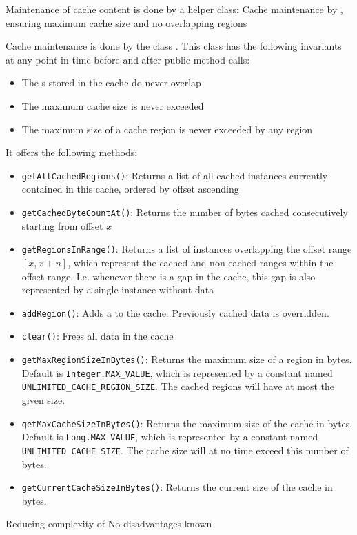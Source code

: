 Maintenance of cache content is done by a helper class:
{%
Cache maintenance by \MediumCache{}, ensuring maximum cache size and no overlapping regions
}
{%
Cache maintenance is done by the class \MediumCache{}. This class has the following invariants at any point in time before and after public method calls:
\begin{itemize}
\item The \MediumRegion{}s stored in the cache do never overlap
\item The maximum cache size is never exceeded
\item The maximum size of a cache region is never exceeded by any region
\end{itemize}

It offers the following methods:
\begin{itemize}
\item \texttt{getAllCachedRegions()}: Returns a list of all cached \MediumRegion{} instances currently contained in this cache, ordered by offset ascending
\item \texttt{getCachedByteCountAt()}: Returns the number of bytes cached consecutively starting from offset $x$
\item \texttt{getRegionsInRange()}: Returns a list of \MediumRegion{} instances overlapping the offset range $[x,x+n]$, which represent the cached and non-cached ranges within the offset range. I.e. whenever there is a gap in the cache, this gap is also represented by a single \MediumRegion{} instance without data
\item \texttt{addRegion()}: Adds a \MediumRegion{} to the cache. Previously cached data is overridden.
\item \texttt{clear()}: Frees all data in the cache
\item \texttt{getMaxRegionSizeInBytes()}: Returns the maximum size of a region in bytes. Default is \texttt{Integer.MAX\_VALUE}, which is represented by a constant named \texttt{UNLIMITED\_CACHE\_REGION\_SIZE}. The cached regions will have at most the given size.
\item \texttt{getMaxCacheSizeInBytes()}: Returns the maximum size of the cache in bytes. Default is \texttt{Long.MAX\_VALUE}, which is represented by a constant named \texttt{UNLIMITED\_CACHE\_SIZE}. The cache size will at no time exceed this number of bytes.
\item \texttt{getCurrentCacheSizeInBytes()}: Returns the current size of the cache in bytes.
\end{itemize}
}
{%
Reducing complexity of \IMediumStore{}
}
{%
No disadvantages known
}


